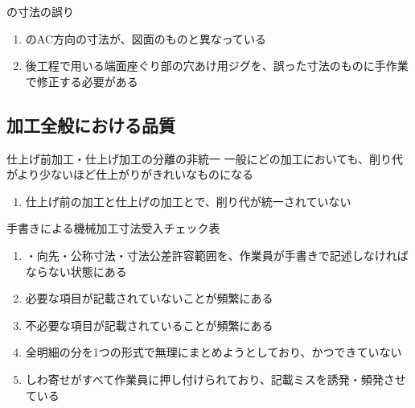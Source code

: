\begin{Issues}{\EndFaceBoringMilling の寸法の誤り}
\begin{enumerate}[label=\sarrow]
\item[{\sarrow[red]}]\EndFaceBoringMilling のAC方向の寸法が、図面のものと異なっている
\item 後工程で用いる端面座ぐり部の穴あけ用ジグを、誤った寸法のものに手作業で修正する必要がある
\end{enumerate}
\end{Issues}


\clearpage
\subsection{加工全般における品質}

\begin{Issues}{仕上げ前加工・仕上げ加工の分離の非統一}
一般にどの加工においても、削り代がより少ないほど仕上がりがきれいなものになる
\begin{enumerate}[label=\sarrow]
\item[{\sarrow[red]}]仕上げ前の加工と仕上げの加工とで、削り代が統一されていない
\end{enumerate}
\end{Issues}

\begin{Issues}{手書きによる機械加工寸法受入チェック表}
\begin{enumerate}[label=\sarrow]
\item[{\sarrow[red]}]\DrawingNumber・向先・公称寸法・寸法公差許容範囲を、作業員が手書きで記述しなければならない状態にある
\item[{\sarrow[red]}]必要な項目が記載されていないことが頻繁にある
\item[{\sarrow[red]}]不必要な項目が記載されていることが頻繁にある
\item[{\sarrow[red]}]全明細の分を1つの形式で無理にまとめようとしており、かつできていない
\item[{\sarrow[red]}]しわ寄せがすべて作業員に押し付けられており、記載ミスを誘発・頻発させている
\end{enumerate}
\end{Issues}



\clearpage


